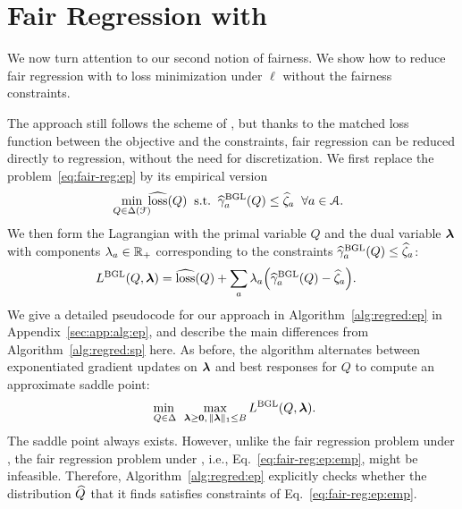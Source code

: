 \section{Fair Regression with \EP}
\label{sec:max-loss-bound}

We now turn attention to our second notion of fairness. We show
how to reduce fair regression with \ep to loss minimization under $\ell$ without the fairness constraints.

The approach still follows the scheme of \citet{agarwal2018reductions}, but
thanks to the matched loss function between the objective and
the constraints, fair regression can be reduced directly to regression,
without the need for discretization.
%
We first replace the problem~\eqref{eq:fair-reg:ep} by its empirical
version
%
\begin{equation}
\label{eq:fair-reg:ep:emp}
  \min_{\mathclap{Q\in\Delta(\calF)}}\;\hloss(Q)
\;\;
\text{s.t.}
\;\;
  \hgammaE_{a}(Q)\le\hzeta_a
\;\;
  \forall a\in\calA.
\end{equation}
%
We then form the Lagrangian with the primal variable $Q$ and the dual variable $\boldsymbol{\lambda}$ with components $\lambda_a\in\mathbb{R}_+$ corresponding to the constraints $\widehat{\gamma}^{\textup{BGL}}_{a}(Q)\le\widehat{\zeta}_a$:
%
\begin{align*}
  L^{\textup{BGL}}(Q,\boldsymbol{\lambda})
&=\widehat{\textup{\mdseries loss}}(Q)+\sum_a\lambda_a\Bigl(\widehat{\gamma}^{\textup{BGL}}_a(Q)-\widehat{\zeta}_a\Bigr).
\end{align*}
%
We give a detailed pseudocode for our approach in Algorithm~\ref{alg:regred:ep} in Appendix~\ref{sec:app:alg:ep}, and describe the main differences from Algorithm~\ref{alg:regred:sp} here. As before, the algorithm alternates between exponentiated gradient updates on $\boldsymbol{\lambda}$ and best responses for $Q$ to compute an approximate saddle point:
\begin{equation}
\label{eq:minmax:ep}
  \adjustlimits\min_{\;\;Q\in\Delta\;\;}\max_{\vlambda\ge\vzero,\,\norm{\vlambda}_1\le B} \LE(Q,\vlambda)
.
\end{equation}
%
The saddle point always exists. However, unlike the fair regression problem under \sp, the fair regression problem under \epshort, i.e., Eq.~\eqref{eq:fair-reg:ep:emp}, might be infeasible. Therefore, Algorithm~\ref{alg:regred:ep} explicitly checks whether the distribution $\widehat{Q}$ that it finds satisfies constraints of Eq.~\eqref{eq:fair-reg:ep:emp}.

